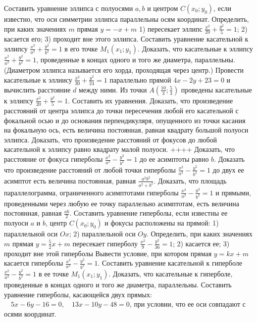 Составить уравнение эллипса с полуосями $a, b$ и центром $C\left(x_0 ; y_0\right)$, если известно, что оси симметрии эллипса параллельны осям координат.
Определить, при каких значениях $m$ прямая $y=-x+m$ 1) пересекает эллипс $\frac{x^2}{20}+\frac{y^2}{5}=1$; 2) касается его; 3) проходит вне этого эллипса.
Составить уравнение касательной к эллипсу $\frac{x^2}{a^2}+\frac{y^2}{b^2}=1$ в его точке $M_1\left(x_1 ; y_1\right)$.
Доказать, что касательные к эллипсу $\frac{x^2}{a^2}+\frac{y^2}{b^2}=1$, проведенные в концах одного и того же диаметра, параллельны. (Диаметром эллипса называется его хорда, проходящая через центр.)
Провести касательные к эллиису $\frac{x^2}{30}+\frac{y^2}{24}=1$ параллельно прямой $4 x-2 y+23=0$ и вычислить расстояние $d$ между ними.
Из точки $A\left(\frac{10}{3} ; \frac{5}{3}\right)$ проведены касательные к эллипсу $\frac{x^2}{20}+\frac{y^2}{5}=1$. Составить их уравнения.
Доказать, что произведение расстояний от центра эллипса до точки пересечения любой его касательной с фокальной осью и до основания перпендикуляря, опущенного из точки касания на фокальную ось, есть величина постоянная, равная квадрату большой полуоси эллипса.
Доказать, что произведение расстояний от фокусов до любой касательной к эллипсу равно квадрату малой полуоси.
++++
Доказать, что расстояние от фокуса гиперболы $\frac{x^2}{a^2}-\frac{y^2}{b^2}=1$ до ее асимптоты равно $b$.
Доказать что произведение расстояний от любой точки гиперболы $\frac{x^2}{a^2}-\frac{y^2}{b^2}=1$ до двух ее асимптот есть величина постоянная, равная $\frac{a^2 b^2}{a^2+b^2}$.
Доказать, что площадь параллелограмма, ограниченного асимптотами гиперболы $\frac{x^2}{a^2}-\frac{y^2}{b^2}=1$ и прямыми, проведенными через любую ее точку параллельно асимптотам, есть величина постоянная, равная $\frac{a b}{2}$.
Составить уравнение гиперболы, если известны ее полуоси $a$ и $b$, центр $C\left(x_0 ; y_0\right)$ и фокусы расположены на прямой: 1) параллельной оси $O x$; 2) параллельной оси $O y$.
Определить, при каких значениях $m$ прямая $y=\frac{5}{2} x+m$ пересекает гиперболу $\frac{x^2}{9}-\frac{y^2}{36}=1$; 2) касается ее; 3) проходит вне этой гиперболы
Вывести условие, при котором прямая $y=k x+m$ касается гиперболы $\frac{x^2}{a^2}-\frac{y^2}{b^2}=1$.
Составить уравнение касательной к гиперболе $\frac{x^2}{a^2}-\frac{y^2}{b^2}=1$ в ее точке $M_1\left(x_1 ; y_1\right)$.
Доказать, что касательные к гиперболе, проведенные в концах одного и того же диаметра, параллельны.
Составить уравнение гиперболы, касающейся двух прямых: $\quad 5 x-6 y-16=0, \quad 13 x-10 y-48=0$, при условии, что ее оси совпадают с осями координат.
